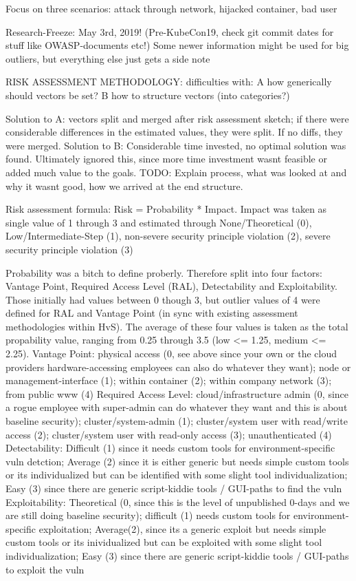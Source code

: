 Focus on three scenarios: attack through network, hijacked container, bad user

Research-Freeze: May 3rd, 2019! (Pre-KubeCon19, check git commit dates for stuff like OWASP-documents etc!)
Some newer information might be used for big outliers, but everything else just gets a side note

RISK ASSESSMENT METHODOLOGY:
difficulties with: 
A how generically should vectors be set?
B how to structure vectors (into categories?) 

Solution to A: vectors split and merged after risk assessment sketch; if there were considerable differences in the estimated values, they were split. If no diffs, they were merged.
Solution to B: Considerable time invested, no optimal solution was found. Ultimately ignored this, since more time investment wasnt feasible or added much value to the goals. TODO: Explain process, what was looked at and why it wasnt good, how we arrived at the end structure.

Risk assessment formula:
Risk = Probability * Impact.
Impact was taken as single value of 1 through 3  and estimated through None/Theoretical (0), Low/Intermediate-Step (1), non-severe security principle violation (2), severe security principle violation (3)

Probability was a bitch to define proberly. Therefore split into four factors: Vantage Point, Required Access Level (RAL), Detectability and Exploitability. Those initially had values between 0 though 3, but outlier values of 4  were defined for RAL and Vantage Point (in sync with existing assessment methodologies within HvS).
The average of these four values is taken as the total propability value, ranging from 0.25 through 3.5 (low <= 1.25, medium <= 2.25).
Vantage Point: physical access (0, see above since your own or the cloud providers hardware-accessing employees can also do whatever they want); node or management-interface (1); within container (2); within company network (3); from public www (4)
Required Access Level: cloud/infrastructure admin (0, since a rogue employee with super-admin can do whatever they want and this is about baseline security); cluster/system-admin (1); cluster/system user with read/write access (2); cluster/system user with read-only access (3); unauthenticated (4)
Detectability: Difficult (1) since it needs custom tools for environment-specific vuln detction; Average (2) since it is either generic but needs simple custom tools or its individualized but can be identified with some slight tool individualization; Easy (3) since there are generic script-kiddie tools / GUI-paths to find the vuln
Exploitability: Theoretical (0, since this is the level of unpublished 0-days and we are still doing baseline security); difficult (1) needs custom tools for environment-specific exploitation; Average(2), since its a generic exploit but needs simple custom tools or its inividualized but can be exploited with some slight tool individualization; Easy (3) since there are generic script-kiddie tools / GUI-paths to exploit the vuln

